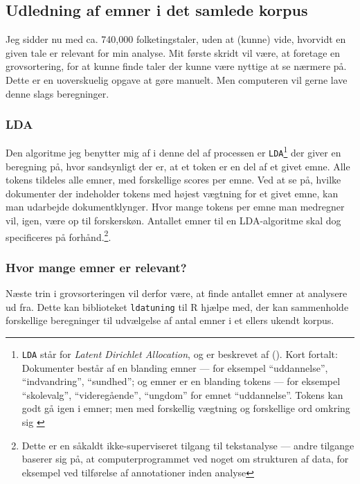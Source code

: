 \subsection{Udledning af emner i det samlede korpus}

Jeg sidder nu med ca. 740,000 folketingstaler, uden at (kunne) vide, hvorvidt en given tale er relevant for min analyse.
Mit første skridt vil være, at foretage en grovsortering, for at kunne finde taler der kunne være nyttige at se nærmere på.
Dette er en uoverskuelig opgave at gøre manuelt.
Men computeren vil gerne lave denne slags beregninger.

\subsubsection{LDA}
Den algoritme jeg benytter mig af i denne del af processen er \texttt{LDA}\footnote{\texttt{LDA} står for \textit{Latent Dirichlet Allocation}, og er beskrevet af \citeauthor{bleiLatentDirichletAllocation2003} (\citeyear{bleiLatentDirichletAllocation2003}). Kort fortalt: Dokumenter består af en blanding emner --- for eksempel “uddannelse”, “indvandring”, “sundhed”; og emner er en blanding tokens --- for eksempel “skolevalg”, “videregående”, “ungdom” for emnet “uddannelse”. Tokens kan godt gå igen i emner; men med forskellig vægtning og forskellige ord omkring sig \autocite[s. 86]{silgeTextMiningTidy2017}
}
der giver en beregning på, hvor sandsynligt der er, at et token er en del af et givet emne.
Alle tokens tildeles alle emner, med forskellige scores per emne.
Ved at se på, hvilke dokumenter der indeholder tokens med højest vægtning for et givet emne, kan man udarbejde dokumentklynger.
Hvor mange tokens per emne man medregner vil, igen, være op til forskerskøn.
Antallet emner til en LDA-algoritme skal dog specificeres på forhånd.\footnote{Dette er en såkaldt ikke-superviseret tilgang til tekstanalyse --- andre tilgange baserer sig på, at computerprogrammet ved noget om strukturen af data, for eksempel ved tilførelse af annotationer inden analyse}.

\subsubsection{Hvor mange emner er relevant?}
Næste trin i grovsorteringen vil derfor være, at finde antallet emner at analysere ud fra. 
Dette kan biblioteket \texttt{ldatuning} til R hjælpe med, der kan sammenholde forskellige beregninger til udvælgelse af antal emner i et ellers ukendt korpus\autocite{nikitaSelectNumberTopics2016}.

